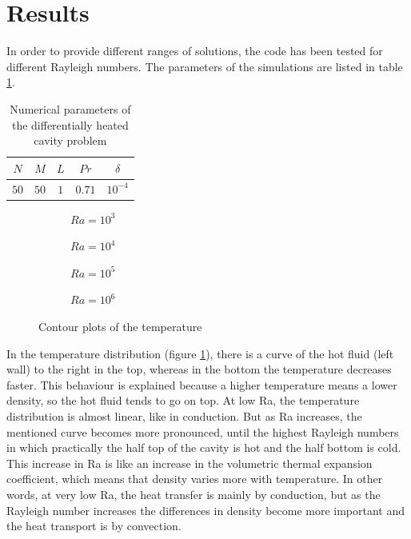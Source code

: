 \section{Results}
In order to provide different ranges of solutions, the code has been tested for different Rayleigh numbers. The parameters of the simulations are listed in table \ref{NumericalParamDiffHeated}.
\begin{table}[H]
	\centering
	\begin{tabular}{ |c|c|c|c|c| }
		\hline
		$N$ & $M$ & $L$ & $Pr$ & $\delta$ \\ \hline
		$50$ & $50$ & $1$ & $0.71$ & $10^{-4}$ \\ \hline
	\end{tabular}
\caption{Numerical parameters of the differentially heated cavity problem}
\label{NumericalParamDiffHeated}
\end{table}
\begin{figure}[h]
	\begin{subfigure}{0.5\textwidth}
		\resizebox{1.4\textwidth}{!}{}
		\caption{$Ra=10^{3}$}
	\end{subfigure}%
	\begin{subfigure}{0.5\textwidth}
		\resizebox{1.4\textwidth}{!}{}
		\caption{$Ra=10^{4}$}
	\end{subfigure}
	\begin{subfigure}{0.5\textwidth}
		\resizebox{1.4\textwidth}{!}{}
		\caption{$Ra=10^{5}$}
	\end{subfigure}%
	\begin{subfigure}{0.5\textwidth}
		\resizebox{1.4\textwidth}{!}{}
		\caption{$Ra=10^{6}$}
	\end{subfigure}
	\caption{Contour plots of the temperature}
	\label{TemperatureDiffHeated}
\end{figure}
In the temperature distribution (figure \ref{TemperatureDiffHeated}), there is a curve of the hot fluid (left wall) to the right in the top, whereas in the bottom the temperature decreases faster. This behaviour is explained because a higher temperature means a lower density, so the hot fluid tends to go on top. At low Ra, the temperature distribution is almost linear, like in conduction. But as Ra increases, the mentioned curve becomes more pronounced, until the highest Rayleigh numbers in which practically the half top of the cavity is hot and the half bottom is cold. This increase in Ra is like an increase in the volumetric thermal expansion coefficient, which means that density varies more with temperature. In other words, at very low Ra, the heat transfer is mainly by conduction, but as the Rayleigh number increases the differences in density become more important and the heat transport is by convection.

